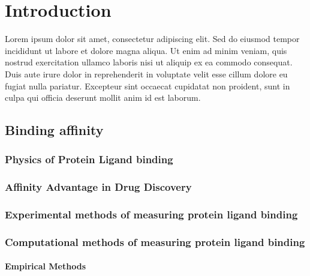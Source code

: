 \chapter{Introduction}
Lorem ipsum dolor sit amet, consectetur adipiscing elit. Sed do eiusmod tempor incididunt ut labore et dolore magna aliqua. Ut enim ad minim veniam, quis nostrud exercitation ullamco laboris nisi ut aliquip ex ea commodo consequat. Duis aute irure dolor in reprehenderit in voluptate velit esse cillum dolore eu fugiat nulla pariatur. Excepteur sint occaecat cupidatat non proident, sunt in culpa qui officia deserunt mollit anim id est laborum.

\label{introduction}


\lipsum[1][1-3]

\section{Binding affinity}

\lipsum[1][1-3]

\subsection{Physics of Protein Ligand binding}

\subsection{Affinity Advantage in Drug Discovery}

\lipsum[1][1-3]

\subsection{Experimental methods of measuring protein ligand binding}

\lipsum[1][1-3]

\subsection{Computational methods of measuring protein ligand binding}

\lipsum[1][1-3]

\subsubsection{Empirical Methods}

